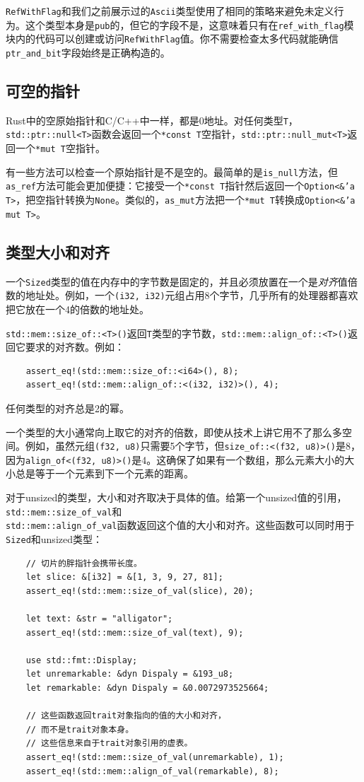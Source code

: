 \texttt{RefWithFlag}和我们之前展示过的\texttt{Ascii}类型使用了相同的策略来避免未定义行为。这个类型本身是\texttt{pub}的，但它的字段不是，这意味着只有在\texttt{ref\_with\_flag}模块内的代码可以创建或访问\texttt{RefWithFlag}值。你不需要检查太多代码就能确信\texttt{ptr\_and\_bit}字段始终是正确构造的。

\subsection{可空的指针}
Rust中的空原始指针和C/C++中一样，都是0地址。对任何类型\texttt{T}，\texttt{std::ptr::null<T>}函数会返回一个\texttt{*const T}空指针，\texttt{std::ptr::null\_mut<T>}返回一个\texttt{*mut T}空指针。

有一些方法可以检查一个原始指针是不是空的。最简单的是\texttt{is\_null}方法，但\texttt{as\_ref}方法可能会更加便捷：它接受一个\texttt{*const T}指针然后返回一个\texttt{Option<\&'a T>}，把空指针转换为\texttt{None}。类似的，\texttt{as\_mut}方法把一个\texttt{*mut T}转换成\texttt{Option<\&'a mut T>}。

\subsection{类型大小和对齐}
一个\texttt{Sized}类型的值在内存中的字节数是固定的，并且必须放置在一个是\emph{对齐}值倍数的地址处。例如，一个\texttt{(i32, i32)}元组占用8个字节，几乎所有的处理器都喜欢把它放在一个4的倍数的地址处。

\texttt{std::mem::size\_of::<T>()}返回\texttt{T}类型的字节数，\texttt{std::mem::align\_of::<T>()}返回它要求的对齐数。例如：
\begin{verbatim}
    assert_eq!(std::mem::size_of::<i64>(), 8);
    assert_eq!(std::mem::align_of::<(i32, i32)>(), 4);
\end{verbatim}

任何类型的对齐总是2的幂。

一个类型的大小通常向上取它的对齐的倍数，即使从技术上讲它用不了那么多空间。例如，虽然元组\texttt{(f32, u8)}只需要5个字节，但\texttt{size\_of::<(f32, u8)>()}是8，因为\texttt{align\_of<(f32, u8)>()}是4。这确保了如果有一个数组，那么元素大小的大小总是等于一个元素到下一个元素的距离。

对于unsized的类型，大小和对齐取决于具体的值。给第一个unsized值的引用，\texttt{std::mem::size\_of\_val}和\\
\texttt{std::mem::align\_of\_val}函数返回这个值的大小和对齐。这些函数可以同时用于\texttt{Sized}和unsized类型：
\begin{verbatim}
    // 切片的胖指针会携带长度。
    let slice: &[i32] = &[1, 3, 9, 27, 81];
    assert_eq!(std::mem::size_of_val(slice), 20);

    let text: &str = "alligator";
    assert_eq!(std::mem::size_of_val(text), 9);

    use std::fmt::Display;
    let unremarkable: &dyn Dispaly = &193_u8;
    let remarkable: &dyn Dispaly = &0.0072973525664;

    // 这些函数返回trait对象指向的值的大小和对齐，
    // 而不是trait对象本身。
    // 这些信息来自于trait对象引用的虚表。
    assert_eq!(std::mem::size_of_val(unremarkable), 1);
    assert_eq!(std::mem::align_of_val(remarkable), 8);
\end{verbatim}

